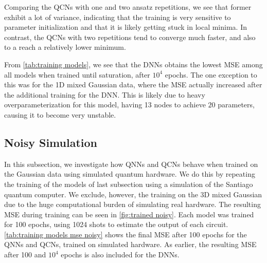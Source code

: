 Comparing the QCNs with one and two ansatz repetitions, we see that former exhibit a lot of variance, indicating that the training is very sensitive to parameter initialization and that it is likely getting stuck in local minima. In contrast, the QCNs with two repetitions tend to converge much faster, and also to a reach a relatively lower minimum. 

From \autoref{tab:training models}, we see that the DNNs obtains the lowest MSE among all models when trained until saturation, after $10^4$ epochs. The one exception to this was for the 1D mixed Gaussian data, where the MSE actually increased after the additional training for the DNN. This is likely due to heavy overparameterization for this model, having 13 nodes to achieve $20$ parameters, causing it to become very unstable.


\subsection{Noisy Simulation}\label{sec:Noisy Simulation}
In this subsection, we investigate how QNNs and QCNs behave when trained on the Gaussian data using simulated quantum hardware. We do this by repeating the training of the models of last subsection using a simulation of the Santiago quantum computer. We exclude, however, the training on the 3D mixed Gaussian due to the huge computational burden of simulating real hardware. The resulting MSE during training can be seen in \autoref{fig:trained noisy}. Each model was trained for 100 epochs, using 1024 shots to estimate the output of each circuit. \autoref{tab:training models mse noisy} shows the final MSE after 100 epochs for the QNNs and QCNs, trained on simulated hardware. As earlier, the resulting MSE after 100 and $10^{4}$ epochs is also included for the DNNs.



